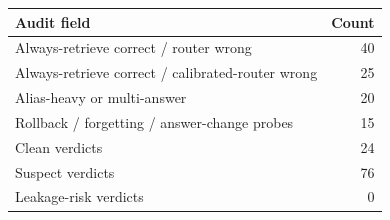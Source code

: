 \begin{tabular}{lr}
\toprule
Audit field & Count \\
\midrule
Always-retrieve correct / router wrong & 40 \\
Always-retrieve correct / calibrated-router wrong & 25 \\
Alias-heavy or multi-answer & 20 \\
Rollback / forgetting / answer-change probes & 15 \\
\midrule
Clean verdicts & 24 \\
Suspect verdicts & 76 \\
Leakage-risk verdicts & 0 \\
\bottomrule
\end{tabular}

